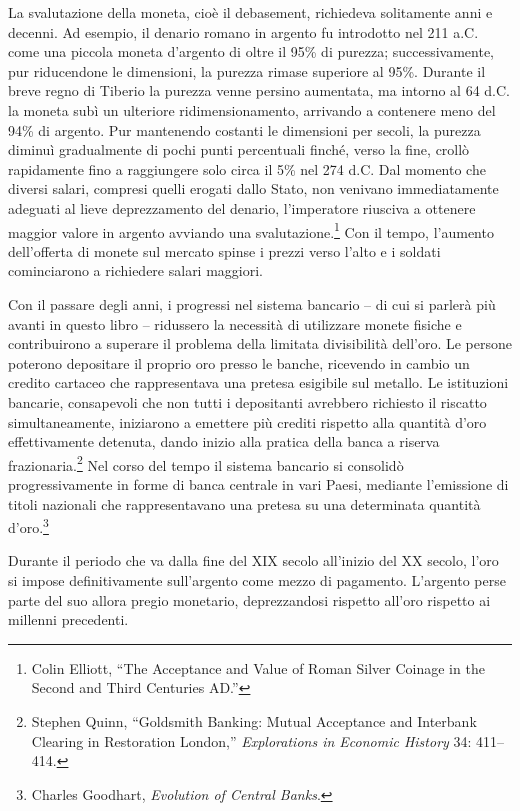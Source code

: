 \documentclass[
  a5paper,
  smalldemyvopaper,10pt,twoside,onecolumn,openright,extrafontsizes,hidelinks]{memoir}
\begin{document}
La svalutazione della moneta, cioè il debasement, richiedeva solitamente
anni e decenni. Ad esempio, il denario romano in argento fu introdotto
nel 211 a.C. come una piccola moneta d'argento di oltre il 95\% di
purezza; successivamente, pur riducendone le dimensioni, la purezza
rimase superiore al 95\%. Durante il breve regno di Tiberio la purezza
venne persino aumentata, ma intorno al 64 d.C. la moneta subì un
ulteriore ridimensionamento, arrivando a contenere meno del 94\% di
argento. Pur mantenendo costanti le dimensioni per secoli, la purezza
diminuì gradualmente di pochi punti percentuali finché, verso la fine,
crollò rapidamente fino a raggiungere solo circa il 5\% nel 274 d.C. Dal
momento che diversi salari, compresi quelli erogati dallo Stato, non
venivano immediatamente adeguati al lieve deprezzamento del denario,
l'imperatore riusciva a ottenere maggior valore in argento avviando una
svalutazione.\footnote{Colin Elliott, ``The Acceptance and Value of
  Roman Silver Coinage in the Second and Third Centuries AD.''} Con il
tempo, l'aumento dell'offerta di monete sul mercato spinse i prezzi
verso l'alto e i soldati cominciarono a richiedere salari maggiori.

Con il passare degli anni, i progressi nel sistema bancario -- di cui si
parlerà più avanti in questo libro -- ridussero la necessità di
utilizzare monete fisiche e contribuirono a superare il problema della
limitata divisibilità dell'oro. Le persone poterono depositare il
proprio oro presso le banche, ricevendo in cambio un credito cartaceo
che rappresentava una pretesa esigibile sul metallo. Le istituzioni
bancarie, consapevoli che non tutti i depositanti avrebbero richiesto il
riscatto simultaneamente, iniziarono a emettere più crediti rispetto
alla quantità d'oro effettivamente detenuta, dando inizio alla pratica
della banca a riserva frazionaria.\footnote{Stephen Quinn, ``Goldsmith
  Banking: Mutual Acceptance and Interbank Clearing in Restoration
  London,'' \emph{Explorations in Economic History} 34: 411--414.} Nel
corso del tempo il sistema bancario si consolidò progressivamente in
forme di banca centrale in vari Paesi, mediante l'emissione di titoli
nazionali che rappresentavano una pretesa su una determinata quantità
d'oro.\footnote{Charles Goodhart, \emph{Evolution of Central Banks}.}

Durante il periodo che va dalla fine del XIX secolo all'inizio del XX
secolo, l'oro si impose definitivamente sull'argento come mezzo di
pagamento. L'argento perse parte del suo allora pregio monetario,
deprezzandosi rispetto all'oro rispetto ai millenni precedenti.
\end{document}
